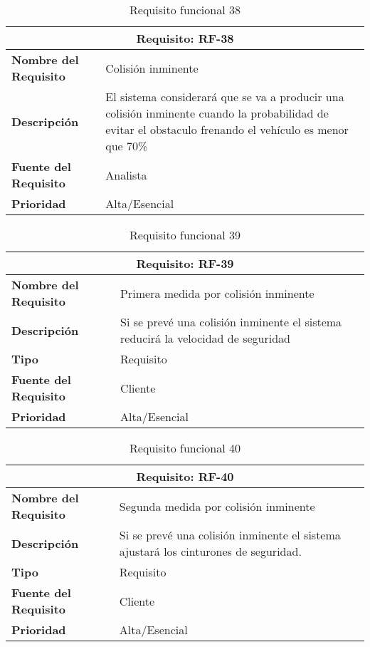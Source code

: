 \begin{table}[H]
\begin{center}
\begin{tabular}{p{} p{7cm}}
\multicolumn{2}{c}{\textbf{Requisito: RF-38} } \\
\hline \hline
\textbf{Nombre del Requisito} & Colisión inminente\\
\hline
\textbf{Descripción} &  El sistema considerará que se va a producir una colisión inminente cuando la probabilidad de evitar el obstaculo frenando el vehículo es menor que 70\%  \\
\hline
\textbf{Fuente del Requisito} & Analista \\
\hline
\textbf{Prioridad} & Alta/Esencial \\ \hline
\end{tabular}
\caption{Requisito funcional 38}
\label{tab:RF-38}
\end{center}
\end{table}

\begin{table}[H]
\begin{center}
\begin{tabular}{p{} p{7cm}}
\multicolumn{2}{c}{\textbf{Requisito: RF-39} } \\
\hline \hline
\textbf{Nombre del Requisito} & Primera medida por colisión inminente\\
\hline
\textbf{Descripción} &  Si se prevé una colisión inminente el sistema reducirá la velocidad de seguridad\\
\hline
\textbf{Tipo} & Requisito  \\
\hline
\textbf{Fuente del Requisito} & Cliente  \\
\hline
\textbf{Prioridad} & Alta/Esencial \\ \hline
\end{tabular}
\caption{Requisito funcional 39}
\label{tab:RF-39}
\end{center}
\end{table}

\begin{table}[H]
\begin{center}
\begin{tabular}{p{} p{7cm}}
\multicolumn{2}{c}{\textbf{Requisito: RF-40} } \\
\hline \hline
\textbf{Nombre del Requisito} & Segunda medida por colisión inminente\\
\hline
\textbf{Descripción} &  Si se prevé una colisión inminente el sistema ajustará los cinturones de seguridad.\\
\textbf{Tipo} & Requisito  \\
\hline
\textbf{Fuente del Requisito} & Cliente  \\
\hline
\textbf{Prioridad} & Alta/Esencial \\ \hline
\end{tabular}
\caption{Requisito funcional 40}
\label{tab:RF-40}
\end{center}
\end{table}

